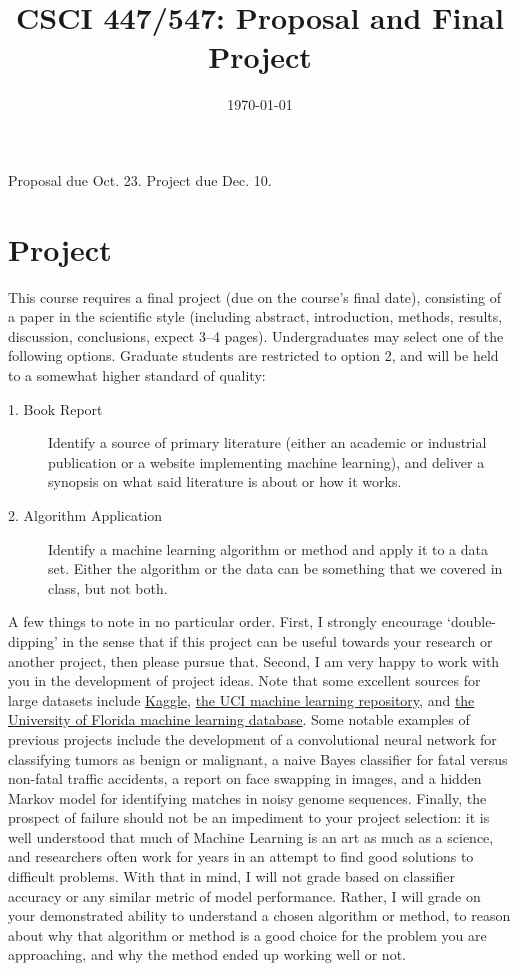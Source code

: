 \documentclass[11pt]{article}
\title{CSCI 447/547: Proposal and Final Project}
\date{\today}
\begin{document}
\maketitle
\noindent Proposal due Oct. 23.  Project due Dec. 10. 

\section{Project}
This course requires a final project (due on the course's final date), consisting of a paper in the scientific style (including abstract, introduction, methods, results, discussion, conclusions, expect 3--4 pages).  Undergraduates may select one of the following options.  Graduate students are restricted to option 2, and will be held to a somewhat higher standard of quality:
\begin{description}
	\item[1. Book Report]{Identify a source of primary literature (either an academic or industrial publication or a website implementing machine learning), and deliver a synopsis on what said literature is about or how it works.}
	\item[2. Algorithm Application]{Identify a machine learning algorithm or method and apply it to a data set.  Either the algorithm or the data can be something that we covered in class, but not both.}
\end{description}
A few things to note in no particular order.  First, I strongly encourage `double-dipping' in the sense that if this project can be useful towards your research or another project, then please pursue that.  Second, I am very happy to work with you in the development of project ideas.  Note that some excellent sources for large datasets include \href{https://www.kaggle.com/}{Kaggle}, \href{https://archive.ics.uci.edu/ml/index.php}{the UCI machine learning repository}, and \href{http://users.stat.ufl.edu/~winner/datasets.html}{the University of Florida machine learning database}.  Some notable examples of previous projects include the development of a convolutional neural network for classifying tumors as benign or malignant, a naive Bayes classifier for fatal versus non-fatal traffic accidents, a report on face swapping in images, and a hidden Markov model for identifying matches in noisy genome sequences.  Finally, the prospect of failure should not be an impediment to your project selection: it is well understood that much of Machine Learning is an art as much as a science, and researchers often work for years in an attempt to find good solutions to difficult problems.  With that in mind, I will not grade based on classifier accuracy or any similar metric of model performance.  Rather, I will grade on your demonstrated ability to understand a chosen algorithm or method, to reason about why that algorithm or method is a good choice for the problem you are approaching, and why the method ended up working well or not.  
\end{document}
